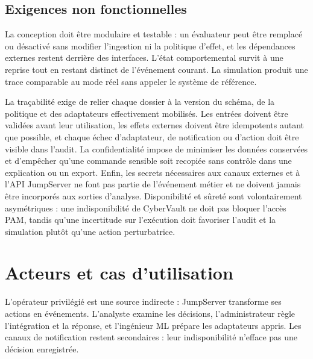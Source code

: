 \documentclass[11pt,a4paper,oneside]{report}
\theoremstyle{definition}
\theoremstyle{plain}
\begin{document}
\subsection{Exigences non fonctionnelles}

La conception doit être modulaire et testable : un évaluateur peut être
remplacé ou désactivé sans modifier l'ingestion ni la politique d'effet, et les
dépendances externes restent derrière des interfaces. L'état comportemental
survit à une reprise tout en restant distinct de l'événement courant. La
simulation produit une trace comparable au mode réel sans appeler le système
de référence.

La traçabilité exige de relier chaque dossier à la version du schéma, de la
politique et des adaptateurs effectivement mobilisés. Les entrées doivent être
validées avant leur utilisation, les effets externes doivent être idempotents
autant que possible, et chaque échec d'adaptateur, de notification ou d'action
doit être visible dans l'audit. La confidentialité impose de minimiser les
données conservées et d'empêcher qu'une commande sensible soit recopiée sans
contrôle dans une explication ou un export. Enfin, les secrets nécessaires aux
canaux externes et à l'API JumpServer ne font pas partie de l'événement métier
et ne doivent jamais être incorporés aux sorties d'analyse. Disponibilité et
sûreté sont volontairement asymétriques : une indisponibilité de CyberVault ne
doit pas bloquer l'accès PAM, tandis qu'une incertitude sur l'exécution doit
favoriser l'audit et la simulation plutôt qu'une action perturbatrice.

\section{Acteurs et cas d'utilisation}
\label{sec:impl-use-cases}

L'opérateur privilégié est une source indirecte : JumpServer transforme ses
actions en événements. L'analyste examine les décisions, l'administrateur règle
l'intégration et la réponse, et l'ingénieur ML prépare les adaptateurs appris.
Les canaux de notification restent secondaires : leur indisponibilité
n'efface pas une décision enregistrée.
\end{document}
